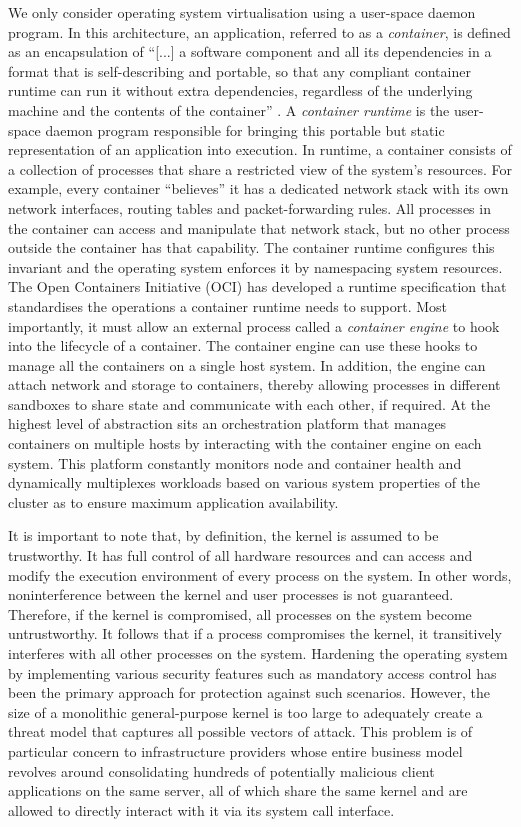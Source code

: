 We only consider operating system virtualisation using a user-space daemon program.
In this architecture, an application, referred to as a \textit{container},
is defined as an encapsulation of \enquote{[...] a software component and all its dependencies 
in a format that is self-describing and portable, so that any compliant container runtime can run it without extra 
dependencies, regardless of the underlying machine and the contents of the container} \cite[1]{oci-runtime-principles}.
A \textit{container runtime} is the user-space daemon program responsible for bringing this portable but 
static representation of an application into execution. In runtime, a container consists of a collection of processes 
that share a restricted view of the system's resources. For example, every container \enquote{believes}
it has a dedicated network stack with its own network interfaces, routing tables and packet-forwarding rules.
All processes in the container can access and manipulate that network stack, but no other process 
outside the container has that capability.
The container runtime configures this invariant and the operating system enforces it by 
namespacing system resources. The Open Containers Initiative (OCI) \cite{oci-website} has 
developed a runtime specification that standardises the operations a container runtime
needs to support. Most importantly, it must allow an external process called a \textit{container engine}
to hook into the lifecycle of a container. The container engine can use these hooks to manage 
all the containers on a single host system. In addition, the engine can attach network and storage 
to containers, thereby allowing processes in different sandboxes to share state and communicate 
with each other, if required. At the highest level of abstraction sits an orchestration platform that 
manages containers on multiple hosts by interacting with the container engine on each system.
This platform constantly monitors node and container health and dynamically multiplexes workloads 
based on various system properties of the cluster as to ensure maximum application availability.

It is important to note that, by definition, the kernel is assumed to be trustworthy. 
It has full control of all hardware resources and can access and modify the execution environment of every process on the system. 
In other words, noninterference between the kernel and user processes is not guaranteed.
Therefore, if the kernel is compromised, all processes on the system become untrustworthy.
It follows that if a process compromises the kernel, it transitively interferes with all other 
processes on the system. Hardening the operating system by implementing various security features such as
mandatory access control has been the primary approach for protection against such scenarios. 
However, the size of a monolithic general-purpose kernel is too large to adequately 
create a threat model that captures all possible vectors of attack. This problem is of particular concern 
to infrastructure providers whose entire business model revolves around consolidating hundreds of potentially 
malicious client applications on the same server, all of which share the same kernel and are allowed to directly interact with 
it via its system call interface. 

